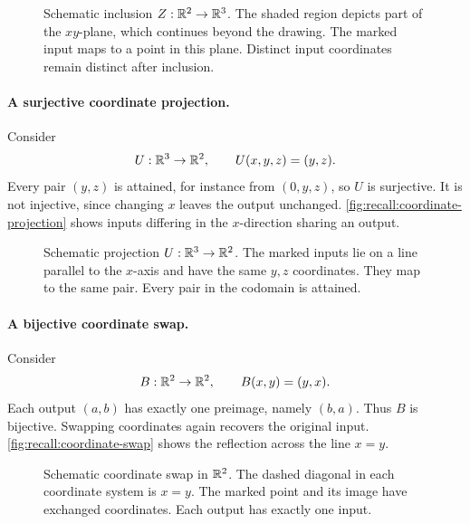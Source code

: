 \begin{figure}[htbp]
  \centering
  
  \caption[Including a plane in three-dimensional space.]{Schematic
    inclusion \(Z:\mathbb{R}^2\to\mathbb{R}^3\). The shaded region
    depicts part of the \(xy\)-plane, which continues beyond the drawing.
    The marked input maps to a point in this plane. Distinct input
    coordinates remain distinct after inclusion.}
  \label{fig:recall:plane-inclusion}
\end{figure}

\paragraph{A surjective coordinate projection.}
Consider
\[
  U:\mathbb{R}^3\to\mathbb{R}^2,\qquad U(x,y,z)=(y,z).
\]
Every pair \((y,z)\) is attained, for instance from \((0,y,z)\), so
\(U\) is surjective. It is not injective, since changing \(x\) leaves
the output unchanged. \autoref{fig:recall:coordinate-projection}
shows inputs differing in the \(x\)-direction sharing an output.

\begin{figure}[htbp]
  \centering
  
  \caption[Forgetting one coordinate.]{Schematic projection
    \(U:\mathbb{R}^3\to\mathbb{R}^2\). The marked inputs
    lie on a line parallel to the \(x\)-axis and have the same \(y,z\)
    coordinates. They map to the same pair. Every pair in the codomain
    is attained.}
  \label{fig:recall:coordinate-projection}
\end{figure}

\paragraph{A bijective coordinate swap.}
Consider
\[
  B:\mathbb{R}^2\to\mathbb{R}^2,\qquad B(x,y)=(y,x).
\]
Each output \((a,b)\) has exactly one preimage, namely \((b,a)\).
Thus \(B\) is bijective. Swapping coordinates again recovers the
original input. \autoref{fig:recall:coordinate-swap} shows the
reflection across the line \(x=y\).

\begin{figure}[htbp]
  \centering
  
  \caption[Swapping two coordinates.]{Schematic coordinate swap in
    \(\mathbb{R}^2\). The dashed diagonal
    in each coordinate system is \(x=y\). The marked point and its
    image have exchanged coordinates. Each output has exactly one input.}
  \label{fig:recall:coordinate-swap}
\end{figure}
